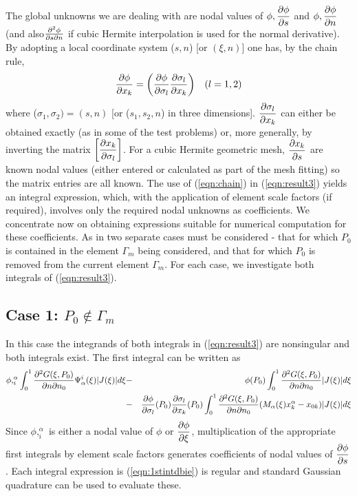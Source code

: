 The global unknowns we are dealing with are nodal values of
$\phi, \dfrac{\partial \phi}{\partial s} $ and $\phi, \dfrac{\partial \phi}{\partial n} $ (and
also$\frac{\partial^{2}\phi}{\partial s\partial n}$ if cubic Hermite interpolation is used
for the normal derivative).  By adopting a local coordinate system ($s,n$) [or
$(\xi,n)$] one has, by the chain rule,
\begin{eqnarray}
  \dfrac{\partial \phi}{\partial x_{k}} =\left( \dfrac{\partial \phi}{\partial \sigma_{l}}  \dfrac{\partial \sigma_{l}}{\partial x_{k}} \right) & & (l=1,2)
 \label{eqn:chain}
\end{eqnarray}
where ($\sigma_{1},\sigma_{2}) = (s,n)$ [or ($s_{1}, s_{2}, n$) in three
dimensions]. $ \dfrac{\partial \sigma_{l}}{\partial x_{k}} $ can either be obtained exactly (as in
some of the test problems) or, more generally, by inverting the matrix
$\left[ \dfrac{\partial x_{k}}{\partial \sigma_{l}} \right]$.  For a cubic Hermite geometric mesh,
$ \dfrac{\partial x_{k}}{\partial s} $ are known nodal values (either entered or calculated as
part of the mesh fitting) so the matrix entries are all known.  The use of
(\ref{eqn:chain}) in (\ref{eqn:result3}) yields an integral expression, which,
with the application of element scale factors (if required), involves only the
required nodal unknowns as coefficients.  We concentrate now on obtaining
expressions suitable for numerical computation for these coefficients.  As in
\citep{liu:1992} two separate cases must be considered - that for which $P_{0}$
is contained in the element $\Gamma_{m}$ being considered, and that for which
$P_{0}$ is removed from the current element $\Gamma_{m}$.  For each case, we
investigate both integrals of (\ref{eqn:result3}).

\subsection*{Case 1:  $P_{0}\notin\Gamma_{m}$} 
In this case the integrands of both integrals in (\ref{eqn:result3}) are
nonsingular and both integrals exist.  The first integral can be written as
\begin{eqnarray}
 \phi,_{i}^{\alpha}\int_{0}^{1}\frac{\partial^{2}G(\xi,P_{0})}
  {\partial n\partial n_{0}}\Psi_{\alpha}^{i}(\xi)|J(\xi)|d\xi &-& \phi(P_{0})
  \int_{0}^{1}\frac{\partial^{2}G(\xi,P_{0})}
  {\partial n\partial n_{0}}|J(\xi)|d\xi\nonumber\\
 &-& \dfrac{\partial \phi}{\partial \sigma_{l}} (P_{0}) \dfrac{\partial \sigma_{l}}{\partial x_{k}} (P_{0})
   \int_{0}^{1}\frac{\partial^{2}G(\xi,P_{0})}{\partial n\partial n_{0}}
   (M_{\alpha}(\xi)x_{k}^{\alpha}-x_{0k})|J(\xi)|d\xi
 \label{eqn:1stintdbie}
\end{eqnarray}
Since $\phi,_{i}^{\alpha}$ is either a nodal value of $\phi$ or
$ \dfrac{\partial \phi}{\partial \xi} $, multiplication of the appropriate first integrals by
element scale factors generates coefficients of nodal values of
$ \dfrac{\partial \phi}{\partial s} $ .  Each integral expression is (\ref{eqn:1stintdbie}) is regular
and standard Gaussian quadrature can be used to evaluate these.

